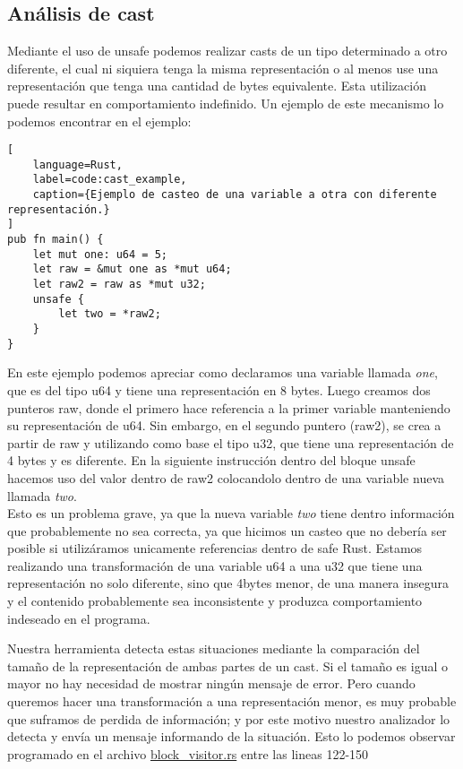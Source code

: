 \subsection{Análisis de cast}
Mediante el uso de unsafe podemos realizar casts de un tipo determinado a otro diferente, el cual ni siquiera tenga la misma representación o al menos use una representación que tenga una cantidad de bytes equivalente. Esta utilización puede resultar en comportamiento indefinido. Un ejemplo de este mecanismo lo podemos encontrar en el ejemplo:

\begin{lstlisting}[
    language=Rust,
    label=code:cast_example,
    caption={Ejemplo de casteo de una variable a otra con diferente representación.}
]
pub fn main() {
    let mut one: u64 = 5;
    let raw = &mut one as *mut u64;
    let raw2 = raw as *mut u32;
    unsafe {
        let two = *raw2;
    }
}
\end{lstlisting}

En este ejemplo podemos apreciar como declaramos una variable llamada \textit{one}, que es del tipo u64 y tiene una representación en 8 bytes. Luego creamos dos punteros raw, donde el primero hace referencia a la primer variable manteniendo su representación de u64. Sin embargo, en el segundo puntero (raw2), se crea a partir de raw y utilizando como base el tipo u32, que tiene una representación de 4 bytes y es diferente. En la siguiente instrucción dentro del bloque unsafe hacemos uso del valor dentro de raw2 colocandolo dentro de una variable nueva llamada \textit{two}.\\
Esto es un problema grave, ya que la nueva variable \textit{two} tiene dentro información que probablemente no sea correcta, ya que hicimos un casteo que no debería ser posible si utilizáramos unicamente referencias dentro de safe Rust. Estamos realizando una transformación de una variable u64 a una u32 que tiene una representación no solo diferente, sino que 4bytes menor, de una manera insegura y el contenido probablemente sea inconsistente y produzca comportamiento indeseado en el programa.

Nuestra herramienta detecta estas situaciones mediante la comparación del tamaño de la representación de ambas partes de un cast. Si el tamaño es igual o mayor no hay necesidad de mostrar ningún mensaje de error. Pero cuando queremos hacer una transformación a una representación menor, es muy probable que suframos de perdida de información; y por este motivo nuestro analizador lo detecta y envía un mensaje informando de la situación. Esto lo podemos observar programado en el archivo \href{run:../src/mir_visitor/block_visitor.rs}{block\_visitor.rs} entre las lineas 122-150

